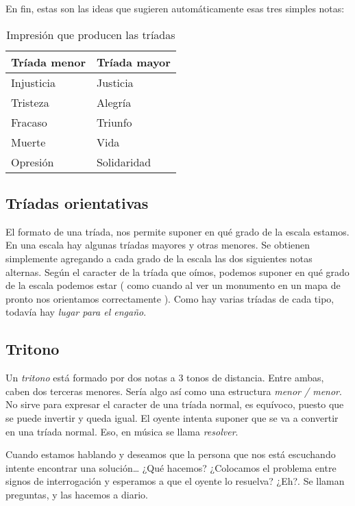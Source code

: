 \documentclass[]{article}
\begin{document}
En fin, estas son las ideas que sugieren automáticamente esas tres simples notas:

\begin{table}[htbp]
  \centering
  \begin{tabular}{ll}
    \toprule
    \textbf{Tríada menor} & \textbf{Tríada mayor} \\
    \midrule
    Injusticia  & Justicia \\
    Tristeza    & Alegría \\
    Fracaso & Triunfo \\
    Muerte  & Vida \\
    Opresión    & Solidaridad \\
    \bottomrule
  \end{tabular}
  \caption{Impresión que producen las tríadas}
  \label{tab:triad-impressions}
\end{table}

\subsection{Tríadas orientativas}

El formato de una tríada, nos permite suponer en qué grado de la escala estamos. En una escala hay algunas tríadas mayores y otras menores. Se obtienen simplemente agregando a cada grado de la escala las dos siguientes notas alternas. Según el caracter de la tríada que oímos, podemos suponer en qué grado de la escala podemos estar ( como cuando al ver un monumento en un mapa de pronto nos orientamos correctamente ). Como hay varias tríadas de cada tipo, todavía hay \emph{lugar para el   engaño}.

\subsection{Tritono}

Un \emph{tritono} está formado por dos notas a 3 tonos de distancia. Entre ambas, caben dos terceras menores. Sería algo así como una estructura \emph{menor / menor}. No sirve para expresar el caracter de una tríada normal, es equívoco, puesto que se puede invertir y queda igual. El oyente intenta suponer que se va a convertir en una tríada normal. Eso, en música se llama \emph{resolver}.

Cuando estamos hablando y deseamos que la persona que nos está escuchando intente encontrar una solución\ldots{} ¿Qué hacemos? ¿Colocamos el problema entre signos de interrogación y esperamos a que el oyente lo resuelva? ¿Eh?. Se llaman preguntas, y las hacemos a diario.
\end{document}
